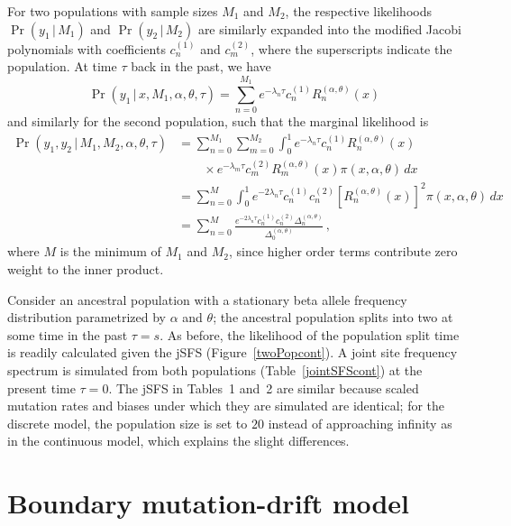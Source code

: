 \documentclass[preprint]{elsarticle}
\newcommand\given{{\,|\,}}
\begin{document}
For two populations with sample sizes $M_1$ and $M_2$, the respective likelihoods $\Pr(y_1\given M_1)$ and $\Pr(y_2\given M_2)$ are similarly expanded into the modified Jacobi polynomials with coefficients $c_n^{(1)}$ and $c_m^{(2)}$, where the superscripts indicate the population. At time $\tau$ back in the past, we have
\begin{equation}
    \Pr(y_1\given x, M_1,\alpha,\theta,\tau)=
    \sum_{n=0}^{M_1} e^{-\lambda_n\tau}c_n^{(1)}R_n^{(\alpha,\theta)}(x)
\end{equation}
and similarly for the second population, such that the marginal likelihood is
\begin{equation}
\begin{split}
    \Pr(y_1,y_2\given M_1,M_2,\alpha,\theta,\tau)&=
    \sum_{n=0}^{M_1}\sum_{m=0}^{M_2}\int_0^1 e^{-\lambda_n\tau}c_n^{(1)}R_n^{(\alpha,\theta)}(x)\\
    &\qquad\times e^{-\lambda_m\tau}c_m^{(2)} R_m^{(\alpha,\theta)}(x)\pi(x,\alpha,\theta)  \,dx\\&=
    \sum_{n=0}^{M}\int_0^1 e^{-2\lambda_n\tau}c_n^{(1)}c_n^{(2)} \left[R_n^{(\alpha,\theta)}(x)\right]^2\pi(x,\alpha,\theta)  \,dx\\
    &=\sum_{n=0}^{M}\frac{e^{-2\lambda_n\tau}c_n^{(1)} c_n^{(2)}\Delta_n^{(\alpha,\theta)}}{\Delta_0^{(\alpha,\theta)}}\,,
\end{split}
\end{equation}
where $M$ is the minimum of $M_1$ and $M_2$, since higher order terms contribute zero weight to the inner product. 

Consider an ancestral population with a stationary beta allele frequency distribution parametrized by $\alpha$ and $\theta$; the ancestral population splits into two at some time in the past $\tau=s$. As before, the likelihood of the population split time is readily calculated given the jSFS (Figure~\ref{twoPopcont}). A joint site frequency spectrum is simulated from both populations (Table~\ref{jointSFScont}) at the present time $\tau=0$. The jSFS in Tables~1 and~2 are similar because scaled mutation rates and biases under which they are simulated are identical; for the discrete model, the population size is set to $20$  instead of approaching infinity as in the continuous model, which explains the slight differences.

\section{Boundary mutation-drift model}\label{section:boundary_mutation_drift_cont}
\end{document}

